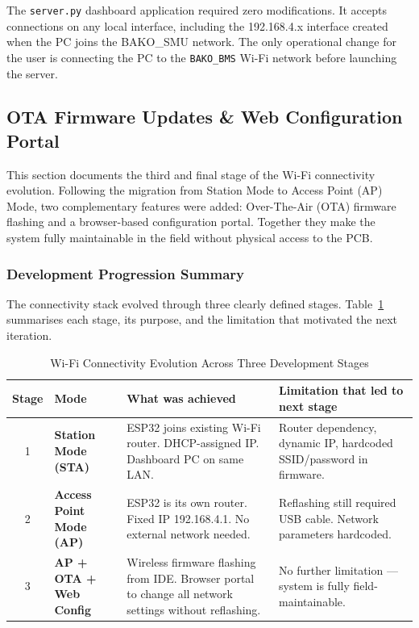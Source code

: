 The \texttt{server.py} dashboard application required zero modifications. It accepts connections on any local interface, including the 192.168.4.x interface created when the PC joins the BAKO\_SMU network. The only operational change for the user is connecting the PC to the \texttt{BAKO\_BMS} Wi-Fi network before launching the server.

\subsection{OTA Firmware Updates \& Web Configuration Portal}
\label{sec:ota}

This section documents the third and final stage of the Wi-Fi connectivity evolution. Following the migration from Station Mode to Access Point (AP) Mode, two complementary features were added: Over-The-Air (OTA) firmware flashing and a browser-based configuration portal. Together they make the system fully maintainable in the field without physical access to the PCB.

\subsubsection*{Development Progression Summary}

The connectivity stack evolved through three clearly defined stages. Table~\ref{tab:wifi-evolution} summarises each stage, its purpose, and the limitation that motivated the next iteration.

\begin{table}[H]
\centering
\caption{Wi-Fi Connectivity Evolution Across Three Development Stages}
\label{tab:wifi-evolution}
\small
\begin{tabular}{c >{\bfseries}p{2.5cm} p{4.5cm} p{4.5cm}}
\toprule
\textbf{Stage} & \textbf{Mode} & \textbf{What was achieved} & \textbf{Limitation that led to next stage} \\
\midrule
1 & Station Mode (STA) & ESP32 joins existing Wi-Fi router. DHCP-assigned IP. Dashboard PC on same LAN. & Router dependency, dynamic IP, hardcoded SSID/password in firmware. \\
\midrule
2 & Access Point Mode (AP) & ESP32 is its own router. Fixed IP 192.168.4.1. No external network needed. & Reflashing still required USB cable. Network parameters hardcoded. \\
\midrule
3 & AP + OTA + Web Config & Wireless firmware flashing from IDE. Browser portal to change all network settings without reflashing. & No further limitation — system is fully field-maintainable. \\
\bottomrule
\end{tabular}
\end{table}

